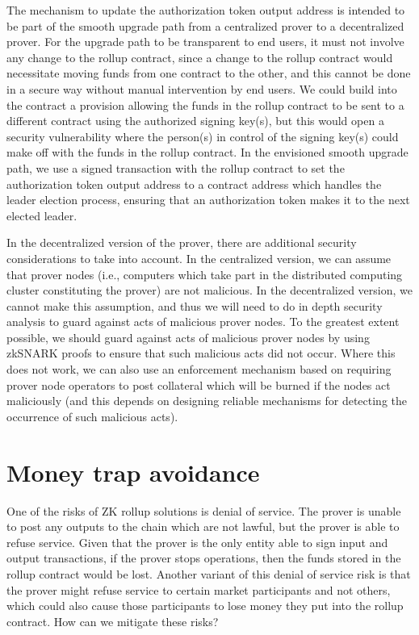 \documentclass[12pt]{article}
\begin{document}
The mechanism to update the authorization token output address is intended to be part of the smooth upgrade path from a centralized prover to a decentralized prover. For the upgrade path to be transparent to end users, it must not involve any change to the rollup contract, since a change to the rollup contract would necessitate moving funds from one contract to the other, and this cannot be done in a secure way without manual intervention by end users. We could build into the contract a provision allowing the funds in the rollup contract to be sent to a different contract using the authorized signing key(s), but this would open a security vulnerability where the person(s) in control of the signing key(s) could make off with the funds in the rollup contract. In the envisioned smooth upgrade path, we use a signed transaction with the rollup contract to set the authorization token output address to a contract address which handles the leader election process, ensuring that an authorization token makes it to the next elected leader.

In the decentralized version of the prover, there are additional security considerations to take into account. In the centralized version, we can assume that prover nodes (i.e., computers which take part in the distributed computing cluster constituting the prover) are not malicious. In the decentralized version, we cannot make this assumption, and thus we will need to do in depth security analysis to guard against acts of malicious prover nodes. To the greatest extent possible, we should guard against acts of malicious prover nodes by using zkSNARK proofs to ensure that such malicious acts did not occur. Where this does not work, we can also use an enforcement mechanism based on requiring prover node operators to post collateral which will be burned if the nodes act maliciously (and this depends on designing reliable mechanisms for detecting the occurrence of such malicious acts).


\section{Money trap avoidance}

One of the risks of ZK rollup solutions is denial of service. The prover is unable to post any outputs to the chain which are not lawful, but the prover is able to refuse service. Given that the prover is the only entity able to sign input and output transactions, if the prover stops operations, then the funds stored in the rollup contract would be lost. Another variant of this denial of service risk is that the prover might refuse service to certain market participants and not others, which could also cause those participants to lose money they put into the rollup contract. How can we mitigate these risks?
\end{document}

